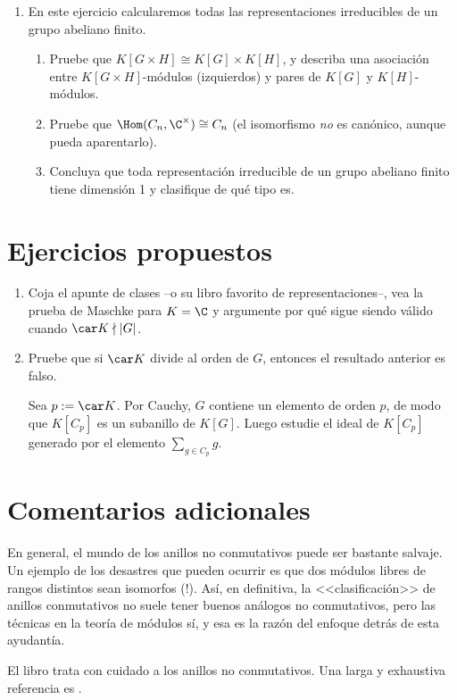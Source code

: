 \documentclass[11pt, reqno]{amsart}
\begin{document}
\begin{enumerate}
	\item En este ejercicio calcularemos todas las representaciones irreducibles de un grupo abeliano finito.
		\begin{enumerate}
			\item Pruebe que $K[G \times H] \cong K[G] \times K[H]$, y describa una asociación entre
				$K[G\times H]$-módulos (izquierdos) y pares de $K[G]$ y $K[H]$-módulos.

			\item Pruebe que $\Hom(C_n, \C^\times) \cong C_n$ (el isomorfismo \emph{no} es canónico, aunque
				pueda aparentarlo).

			\item Concluya que toda representación irreducible de un grupo abeliano finito tiene dimensión 1
				y clasifique de qué tipo es.
		\end{enumerate}
\end{enumerate}

\appendix
\section{Ejercicios propuestos}
\begin{enumerate}
	\item Coja el apunte de clases --o su libro favorito de representaciones--, vea la prueba de Maschke para $K =
		\C$ y argumente por qué sigue siendo válido cuando $\car K \nmid |G|$.
	\item\lookup
		Pruebe que si $\car K$ divide al orden de $G$, entonces el resultado anterior es falso.

		\begin{hint}
			Sea $p := \car K$.
			Por Cauchy, $G$ contiene un elemento de orden $p$, de modo que $K[C_p]$ es un subanillo de
			$K[G]$.
			Luego estudie el ideal de $K[C_p]$ generado por el elemento $\sum_{g \in C_p} g$.
		\end{hint}
\end{enumerate}

\section{Comentarios adicionales}
En general, el mundo de los anillos no conmutativos puede ser bastante salvaje.
Un ejemplo de los desastres que pueden ocurrir es que dos módulos libres de rangos distintos sean isomorfos (!).
Así, en definitiva, la <<clasificación>> de anillos conmutativos no suele tener buenos análogos no conmutativos, pero
las técnicas en la teoría de módulos sí, y esa es la razón del enfoque detrás de esta ayudantía.

El libro \cite{jacobson:basic} trata con cuidado a los anillos no conmutativos.
Una larga y exhaustiva referencia es \cite{rowen:graduate_noncomm}. 

\printbibliography
\end{document}
